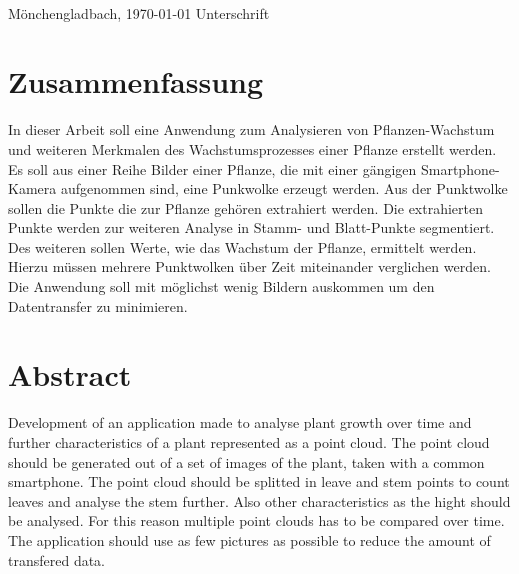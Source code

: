 \documentclass[12pt,titlepage, twoside]{article}
\begin{document}
\vspace{8ex}
\begin{tabbing}
\underline{\hspace{16em}} \hspace{3em}\= \underline{\hspace{14em}} \\
Mönchengladbach, \today \> Unterschrift
\end{tabbing}

\newpage
\section*{Zusammenfassung}
In dieser Arbeit soll eine Anwendung zum Analysieren von Pflanzen-Wachstum und weiteren Merkmalen des Wachstumsprozesses einer Pflanze erstellt werden. 
Es soll aus einer Reihe Bilder einer Pflanze, die mit einer gängigen Smartphone-Kamera aufgenommen sind, eine Punkwolke erzeugt werden. 
Aus der Punktwolke sollen die Punkte die zur Pflanze gehören extrahiert werden. 
Die extrahierten Punkte werden zur weiteren Analyse in Stamm- und Blatt-Punkte segmentiert.
Des weiteren sollen Werte, wie das Wachstum der Pflanze, ermittelt werden. Hierzu müssen mehrere Punktwolken über Zeit miteinander verglichen werden.
Die Anwendung soll mit möglichst wenig Bildern auskommen um den Datentransfer zu minimieren.

\setcounter{page}{1}
\section*{Abstract}
Development of an application made to analyse plant growth over time and further characteristics of a plant represented as a point cloud. The point cloud should be generated out of a set of images of the plant, taken with a common smartphone.
The point cloud should be splitted in leave and stem points to count leaves and analyse the stem further. 
Also other characteristics as the hight should be analysed. For this reason multiple point clouds has to be compared over time.
The application should use as few pictures as possible to reduce the amount of transfered data.

\newpage
\end{document}
